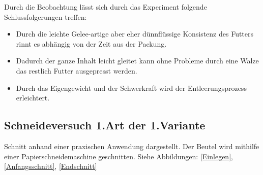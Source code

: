 Durch die Beobachtung lässt sich durch das Experiment folgende Schlussfolgerungen treffen: 
\begin{itemize}
\item Durch die leichte Gelee-artige aber eher dünnflüssige Konsistenz des Futters	rinnt es abhängig von der Zeit aus der Packung.
\item Dadurch der ganze Inhalt leicht gleitet kann ohne Probleme durch eine Walze das restlich Futter ausgepresst werden.
\item Durch das Eigengewicht und der Schwerkraft wird der Entleerungsprozess erleichtert.
\end{itemize} 

\subsection{Schneideversuch 1.Art der 1.Variante}

Schnitt anhand einer praxischen Anwendung dargestellt. Der Beutel wird mithilfe einer Papierschneidemaschine geschnitten. Siehe Abbildungen: \ref{Einlegen}, \ref{Anfangsschnitt}, \ref{Endschnitt}

